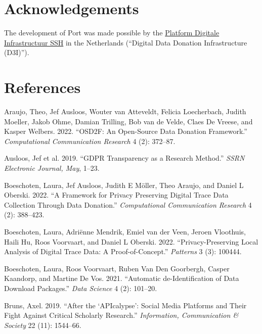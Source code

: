 \documentclass[
]{article}
\newlength{\cslhangindent}
\newlength{\cslentryspacingunit} %
\newenvironment{CSLReferences}[2] %
 {%
  \setlength{\parindent}{0pt}
  \ifodd #1
  \let\oldpar\par
  \def\par{\hangindent=\cslhangindent\oldpar}
  \fi
  \setlength{\parskip}{#2\cslentryspacingunit}
 }%
 {}
\begin{document}
\hypertarget{acknowledgements}{%
\section{Acknowledgements}\label{acknowledgements}}

The development of Port was made possible by the
\href{http://www.pdi-ssh.nl}{Platform Digitale Infrastructuur SSH} in
the Netherlands (``Digital Data Donation Infrastructure (D3I)'').

\hypertarget{references}{%
\section*{References}\label{references}}

\hypertarget{refs}{}
\begin{CSLReferences}{1}{0}
\leavevmode{}%
Araujo, Theo, Jef Ausloos, Wouter van Atteveldt, Felicia Loecherbach,
Judith Moeller, Jakob Ohme, Damian Trilling, Bob van de Velde, Claes De
Vreese, and Kasper Welbers. 2022. {``OSD2F: An Open-Source Data Donation
Framework.''} \emph{Computational Communication Research} 4 (2):
372--87.

\leavevmode{}%
Ausloos, Jef et al. 2019. {``GDPR Transparency as a Research Method.''}
\emph{SSRN Electronic Journal, May}, 1--23.

\leavevmode{}%
Boeschoten, Laura, Jef Ausloos, Judith E Möller, Theo Araujo, and Daniel
L Oberski. 2022. {``A Framework for Privacy Preserving Digital Trace
Data Collection Through Data Donation.''} \emph{Computational
Communication Research} 4 (2): 388--423.

\leavevmode{}%
Boeschoten, Laura, Adriënne Mendrik, Emiel van der Veen, Jeroen
Vloothuis, Haili Hu, Roos Voorvaart, and Daniel L Oberski. 2022.
{``Privacy-Preserving Local Analysis of Digital Trace Data: A
Proof-of-Concept.''} \emph{Patterns} 3 (3): 100444.

\leavevmode{}%
Boeschoten, Laura, Roos Voorvaart, Ruben Van Den Goorbergh, Casper
Kaandorp, and Martine De Vos. 2021. {``Automatic de-Identification of
Data Download Packages.''} \emph{Data Science} 4 (2): 101--20.

\leavevmode{}%
Bruns, Axel. 2019. {``After the {`APIcalypse'}: Social Media Platforms
and Their Fight Against Critical Scholarly Research.''}
\emph{Information, Communication \& Society} 22 (11): 1544--66.


\end{CSLReferences}
\end{document}

